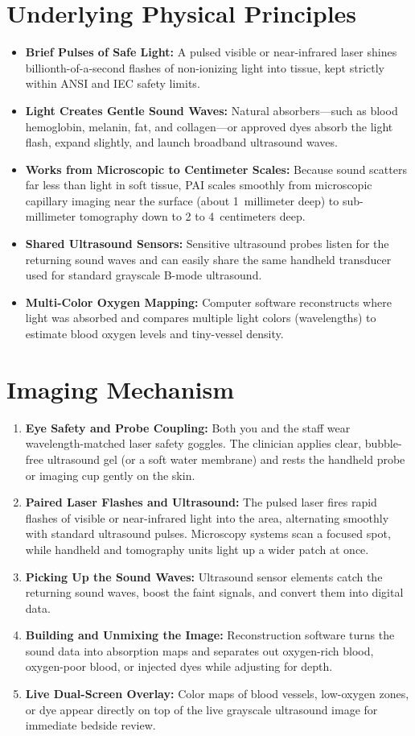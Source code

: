\section{Underlying Physical Principles}
\begin{itemize}
  \item \textbf{Brief Pulses of Safe Light:} A pulsed visible or near-infrared laser shines billionth-of-a-second flashes of non-ionizing light into tissue, kept strictly within ANSI and IEC safety limits.
  \item \textbf{Light Creates Gentle Sound Waves:} Natural absorbers---such as blood hemoglobin, melanin, fat, and collagen---or approved dyes absorb the light flash, expand slightly, and launch broadband ultrasound waves.
  \item \textbf{Works from Microscopic to Centimeter Scales:} Because sound scatters far less than light in soft tissue, PAI scales smoothly from microscopic capillary imaging near the surface (about 1~millimeter deep) to sub-millimeter tomography down to 2 to 4~centimeters deep.
  \item \textbf{Shared Ultrasound Sensors:} Sensitive ultrasound probes listen for the returning sound waves and can easily share the same handheld transducer used for standard grayscale B-mode ultrasound.
  \item \textbf{Multi-Color Oxygen Mapping:} Computer software reconstructs where light was absorbed and compares multiple light colors (wavelengths) to estimate blood oxygen levels and tiny-vessel density.
\end{itemize}

\section{Imaging Mechanism}
\begin{enumerate}
  \item \textbf{Eye Safety and Probe Coupling:} Both you and the staff wear wavelength-matched laser safety goggles. The clinician applies clear, bubble-free ultrasound gel (or a soft water membrane) and rests the handheld probe or imaging cup gently on the skin.
  \item \textbf{Paired Laser Flashes and Ultrasound:} The pulsed laser fires rapid flashes of visible or near-infrared light into the area, alternating smoothly with standard ultrasound pulses. Microscopy systems scan a focused spot, while handheld and tomography units light up a wider patch at once.
  \item \textbf{Picking Up the Sound Waves:} Ultrasound sensor elements catch the returning sound waves, boost the faint signals, and convert them into digital data.
  \item \textbf{Building and Unmixing the Image:} Reconstruction software turns the sound data into absorption maps and separates out oxygen-rich blood, oxygen-poor blood, or injected dyes while adjusting for depth.
  \item \textbf{Live Dual-Screen Overlay:} Color maps of blood vessels, low-oxygen zones, or dye appear directly on top of the live grayscale ultrasound image for immediate bedside review.
\end{enumerate}

